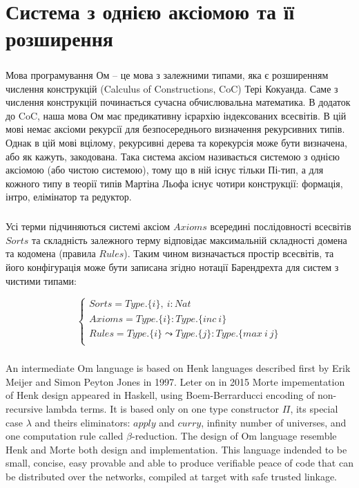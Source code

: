 \chapter{Система з однією аксіомою та її розширення}

   \paragraph{}
   Мова програмування Ом -- це мова з залежними типами, яка є розширенням
   числення конструкцій (Calculus of Constructions, CoC) Тері Кокуанда. Саме з числення
   конструкцій починається сучасна обчислювальна математика. В додаток до CoC,
   наша мова Ом має предикативну ієрархію індексованих всесвітів. В цій мові немає
   аксіоми рекурсії для безпосереднього визначення рекурсивних типів. Однак в цій мові
   вцілому, рекурсивні дерева та корекурсія може бути визначена, або як кажуть, закодована.
   Така система аксіом називається системою з однією аксіомою (або чистою системою), тому що в ній
   існує тільки Пі-тип, а для кожного типу в теорії типів Мартіна Льофа існує чотири
   конструкції: формація, інтро, елімінатор та редуктор.

   \paragraph{}
   Усі терми підчиняються системі аксіом $Axioms$ всередині послідовності всесвітів $Sorts$
   та складність залежного терму відповідає максимальній складності домена та кодомена (правила $Rules$).
   Таким чином визначається простір всесвітів, та його конфігурація може бути записана
   згідно нотації Барендрехта для систем з чистими типами:

$$
\begin{cases}
    Sorts = Type.\{i\},\ i : Nat\\
    Axioms = Type.\{i\} : Type.\{inc\ i\}\\
    Rules = Type.\{i\} \leadsto Type.\{j\} : Type.\{max\ i\ j\}\\
\end{cases}
$$

\newpage
   \paragraph{}
   An intermediate Om language is based on Henk\cite{henk} languages described first
   by Erik Meijer and Simon Peyton Jones in 1997. Leter on in 2015 Morte impementation
   of Henk design appeared in Haskell, using Boem-Berrarducci encoding of non-recursive lambda terms.
   It is based only on one type constructor $\Pi$, its special case $\lambda$ and theirs eliminators:
   $apply$ and $curry$, infinity number of universes,
   and one computation rule called $\beta$-reduction.
   The design of Om language resemble Henk and Morte both
   design and implementation. This language indended to be small, concise, easy provable
   and able to produce verifiable peace of code that can be distributed over the networks,
   compiled at target with safe trusted linkage.

